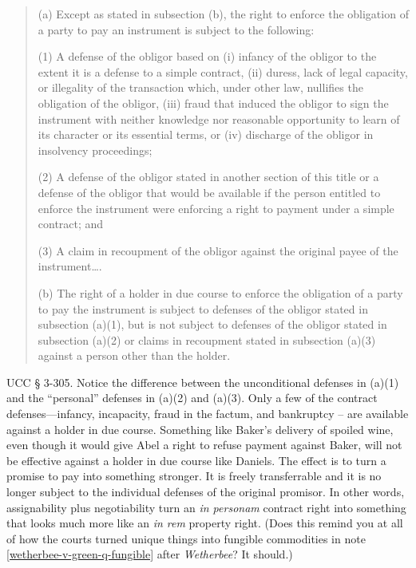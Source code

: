 \begin{quotation}
(a) Except as stated in subsection (b), the right to enforce the obligation of a
party to pay an instrument is subject to the following: 

\begin{statute}
\item (1) A defense of the obligor based on (i) infancy of the obligor to the
extent
it is a defense to a simple contract, (ii) duress, lack of legal capacity, or
illegality of the transaction which, under other law, nullifies the obligation
of the obligor, (iii) fraud that induced the obligor to sign the instrument
with neither knowledge nor reasonable opportunity to learn of its character or
its essential terms, or (iv) discharge of the obligor in insolvency
proceedings; 

\item (2) A defense of the obligor stated in another section of this title or a
defense of the obligor that would be available if the person entitled to
enforce the instrument were enforcing a right to payment under a simple
contract; and 

\item (3) A claim in recoupment of the obligor against the original payee of the
instrument\ldots.
\end{statute}

(b) The right of a holder in due course to enforce the obligation of a party to
pay the instrument is subject to defenses of the obligor stated in subsection
(a)(1), but is not subject to defenses of the obligor stated in subsection
(a)(2) or claims in recoupment stated in subsection (a)(3) against a person
other than the holder. 
\end{quotation}
UCC {\S} 3-305. Notice the difference between the unconditional defenses in
(a)(1) and the ``personal'' defenses in (a)(2) and (a)(3). Only a few of the
contract defenses---infancy, incapacity, fraud in the factum, and bankruptcy
-- are available against a holder in due course. Something like Baker's
delivery of spoiled wine, even though it would give Abel a right to refuse
payment against Baker, will not be effective against a holder in due course
like Daniels. The effect is to turn a promise to pay into something stronger.
It is freely transferrable and it is no longer subject to the individual
defenses of the original promisor. In other words, assignability plus
negotiability turn an \textit{in personam} contract right into something that
looks much more like an \textit{in rem} property right. (Does this remind you
at all of how the courts turned unique things into fungible commodities in note
\ref{wetherbee-v-green-q-fungible} after \textit{Wetherbee}? It should.)

